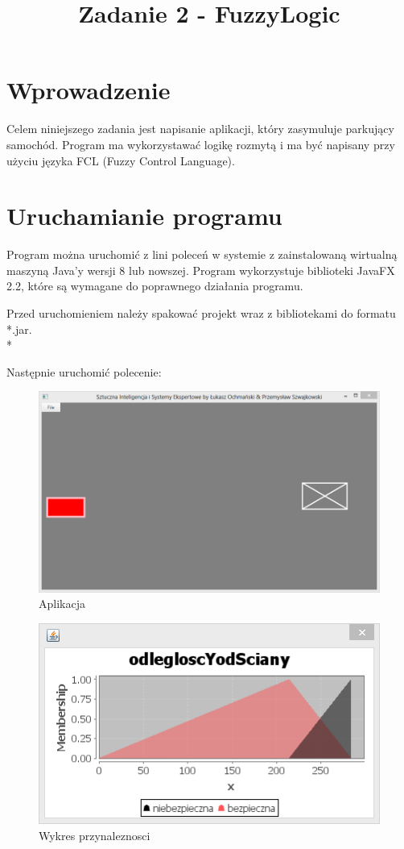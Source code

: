 \documentclass{classrep}
\author{
  \studentinfo{Łukasz Ochmański}{183566} \and
  \studentinfo{Przemysław Szwajkowski}{173524}
}
\title{Zadanie 2 - FuzzyLogic}
\begin{document}
\maketitle


\section{Wprowadzenie}
Celem niniejszego zadania jest napisanie aplikacji, który zasymuluje parkujący samochód. Program ma wykorzystawać logikę rozmytą i ma być napisany przy użyciu języka FCL (Fuzzy Control Language).

\section{Uruchamianie programu}
Program można uruchomić z lini poleceń w systemie z zainstalowaną wirtualną maszyną Java'y wersji 8 lub nowszej. Program wykorzystuje biblioteki JavaFX 2.2, które są wymagane do poprawnego działania programu.

Przed uruchomieniem należy spakować projekt wraz z bibliotekami do formatu *.jar.
\\*

Następnie uruchomić polecenie:

\begin{figure}[ht]
\centering
			\includegraphics[scale=0.50]{pictures/Obraz01.png}
	\caption{Aplikacja}
	\label{fig:Aplikacja}
\end{figure}

\begin{figure}[ht]
\centering
			\includegraphics[scale=1.00]{pictures/Obraz02.png}
	\caption{Wykres przynaleznosci}
	\label{fig:Wykres przynaleznosci}
\end{figure}
\end{document}
